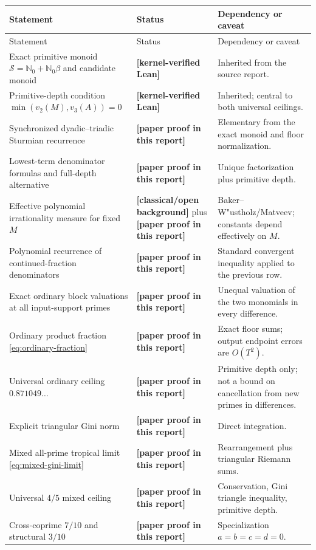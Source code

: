 \documentclass[11pt,oneside]{article}
\theoremstyle{definition}
\theoremstyle{remark}
\newcommand{\Nzero}{\mathbb N_0}
\newcommand{\Sol}{\mathcal S}
\newcommand{\statuslean}{\textcolor{leanblue}{\textbf{[kernel-verified Lean]}}}
\newcommand{\statusnew}{\textcolor{newgreen}{\textbf{[paper proof in this report]}}}
\newcommand{\statusknown}{\textcolor{classicalgray}{\textbf{[classical/open background]}}}
\begin{document}
\begin{longtable}{@{}>{\raggedright\arraybackslash}p{}>{\raggedright\arraybackslash}p{}>{\raggedright\arraybackslash}p{}@{}}
\toprule
Statement & Status & Dependency or caveat \\
\midrule
\endfirsthead
\toprule
Statement & Status & Dependency or caveat \\
\midrule
\endhead
Exact primitive monoid $\Sol=\Nzero+\Nzero\beta$ and candidate monoid & \statuslean & Inherited from the source report. \\
\addlinespace
Primitive-depth condition $\min(v_2(M),v_3(A))=0$ & \statuslean & Inherited; central to both universal ceilings. \\
\addlinespace
Synchronized dyadic--triadic Sturmian recurrence & \statusnew & Elementary from the exact monoid and floor normalization. \\
\addlinespace
Lowest-term denominator formulas and full-depth alternative & \statusnew & Unique factorization plus primitive depth. \\
\addlinespace
Effective polynomial irrationality measure for fixed $M$ & \statusknown{} plus \statusnew & Baker--W"ustholz/Matveev; constants depend effectively on $M$. \\
\addlinespace
Polynomial recurrence of continued-fraction denominators & \statusnew & Standard convergent inequality applied to the previous row. \\
\addlinespace
Exact ordinary block valuations at all input-support primes & \statusnew & Unequal valuation of the two monomials in every difference. \\
\addlinespace
Ordinary product fraction \eqref{eq:ordinary-fraction} & \statusnew & Exact floor sums; output endpoint errors are $O(T^2)$. \\
\addlinespace
Universal ordinary ceiling $0.871049\ldots$ & \statusnew & Primitive depth only; not a bound on cancellation from new primes in differences. \\
\addlinespace
Explicit triangular Gini norm & \statusnew & Direct integration. \\
\addlinespace
Mixed all-prime tropical limit \eqref{eq:mixed-gini-limit} & \statusnew & Rearrangement plus triangular Riemann sums. \\
\addlinespace
Universal $4/5$ mixed ceiling & \statusnew & Conservation, Gini triangle inequality, primitive depth. \\
\addlinespace
Cross-coprime $7/10$ and structural $3/10$ & \statusnew & Specialization $a=b=c=d=0$. \\

\end{longtable}
\end{document}
